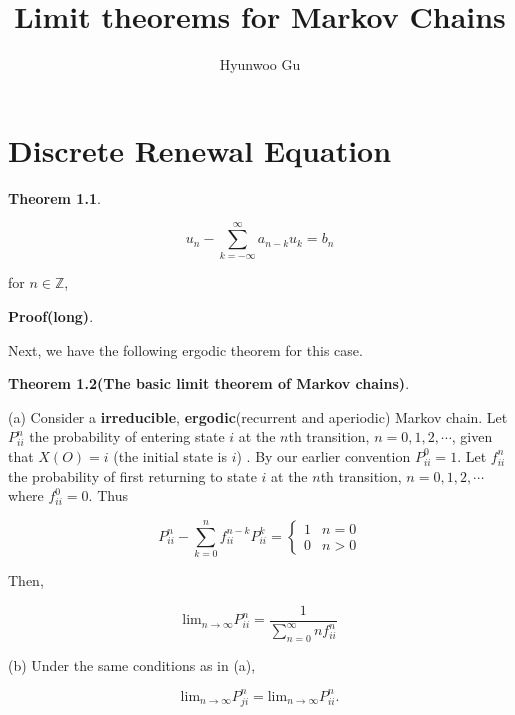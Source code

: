 \documentclass[12pt]{article}
\theoremstyle{nonumberbreak}
\begin{document}
\title{\textbf{Limit theorems for Markov Chains}}
\author{Hyunwoo Gu}
\date{}

\maketitle


\section{Discrete Renewal Equation}


\begin{theorem}
\textbf{Theorem 1.1}.


$$
u_n - \sum_{k=-\infty}^\infty a_{n-k} u_k = b_n
$$

for $n \in \mathbb{Z}$,

\end{theorem}

\textbf{Proof(long)}. 



Next, we have the following ergodic theorem for this case. 

\begin{theorem}
\textbf{Theorem 1.2(The basic limit theorem of Markov chains)}. 

(a) Consider a \textbf{irreducible}, \textbf{ergodic}(recurrent and aperiodic) Markov chain. Let $P_{ii}^n$ the probability of entering state $i$ at the $n$th transition, $n=0,1,2,\cdots$, given that $X(O) = i$ (the initial state is $i$) . By our earlier convention $P_{ii}^0 = 1$. Let $f_{ii}^n$ the probability of first returning to state $i$ at the $n$th transition, $n=0,1,2,\cdots$ where $f_{ii}^0 = 0$. Thus 

$$
P^n_{ii} - \sum_{k=0}^n f_{ii}^{n-k} P_{ii}^k = \begin{cases}
1 & n=0 \\ 
0 & n>0
\end{cases}
$$

Then,

$$
\mathrm{lim}_{n\to\infty} P_{ii}^n = \frac{1}{\sum_{n=0}^\infty n f_{ii}^n}
$$

(b) Under the same conditions as in (a), 

$$
\mathrm{lim}_{n\to\infty} P^n_{ji} = \mathrm{lim}_{n\to\infty} P_{ii}^n.
$$
\end{theorem}
\end{document}
